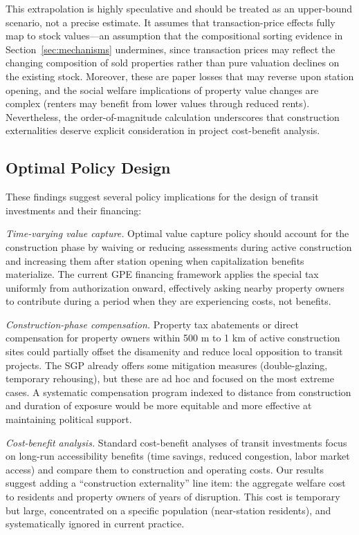 \documentclass[12pt]{article}
\begin{document}
This extrapolation is highly speculative and should be treated as an upper-bound scenario, not a precise estimate. It assumes that transaction-price effects fully map to stock values---an assumption that the compositional sorting evidence in Section~\ref{sec:mechanisms} undermines, since transaction prices may reflect the changing composition of sold properties rather than pure valuation declines on the existing stock. Moreover, these are paper losses that may reverse upon station opening, and the social welfare implications of property value changes are complex (renters may benefit from lower values through reduced rents). Nevertheless, the order-of-magnitude calculation underscores that construction externalities deserve explicit consideration in project cost-benefit analysis.

\subsection{Optimal Policy Design}

These findings suggest several policy implications for the design of transit investments and their financing:

\textit{Time-varying value capture.} Optimal value capture policy should account for the construction phase by waiving or reducing assessments during active construction and increasing them after station opening when capitalization benefits materialize. The current GPE financing framework applies the special tax uniformly from authorization onward, effectively asking nearby property owners to contribute during a period when they are experiencing costs, not benefits.

\textit{Construction-phase compensation.} Property tax abatements or direct compensation for property owners within 500 m to 1 km of active construction sites could partially offset the disamenity and reduce local opposition to transit projects. The SGP already offers some mitigation measures (double-glazing, temporary rehousing), but these are ad hoc and focused on the most extreme cases. A systematic compensation program indexed to distance from construction and duration of exposure would be more equitable and more effective at maintaining political support.

\textit{Cost-benefit analysis.} Standard cost-benefit analyses of transit investments focus on long-run accessibility benefits (time savings, reduced congestion, labor market access) and compare them to construction and operating costs. Our results suggest adding a ``construction externality'' line item: the aggregate welfare cost to residents and property owners of years of disruption. This cost is temporary but large, concentrated on a specific population (near-station residents), and systematically ignored in current practice.
\end{document}
